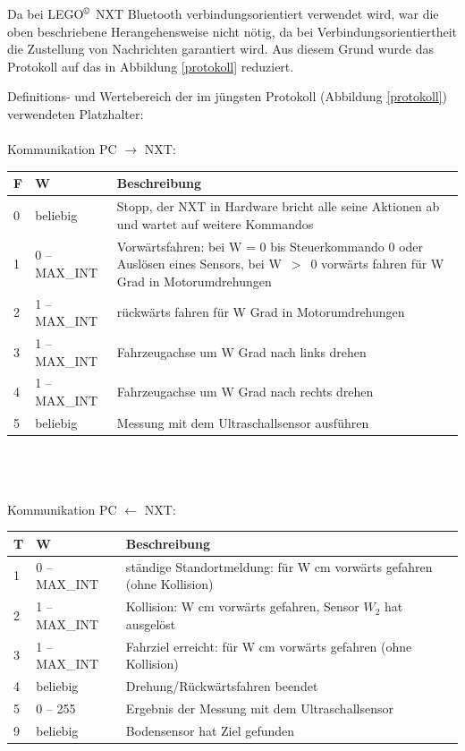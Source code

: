 \documentclass[10pt,a4paper]{scrartcl}
\begin{document}
Da bei LEGO$^\copyright$ NXT Bluetooth verbindungsorientiert verwendet wird, war die oben beschriebene Herangehensweise nicht nötig, da bei Verbindungsorientiertheit die Zustellung von Nachrichten garantiert wird. Aus diesem Grund wurde das Protokoll auf das in Abbildung \ref{protokoll} reduziert.

Definitions- und Wertebereich der im jüngsten Protokoll (Abbildung \ref{protokoll}) verwendeten Platzhalter:\\
\\
Kommunikation PC $\rightarrow$ NXT:\\
\begin{tabular}{|l|l|p{133mm}|}
\hline \textbf{F} & \textbf{W} & \textbf{Beschreibung} \\ 
\hline 0 & beliebig & Stopp, der NXT in Hardware bricht alle seine Aktionen ab und wartet auf weitere Kommandos\\ 
\hline 1 & 0 -- MAX\_INT & Vorwärtsfahren: bei W = 0 bis Steuerkommando 0 oder Auslösen eines Sensors, bei W~$>$~0 vorwärts fahren für W Grad in Motorumdrehungen\\ 
\hline 2 & 1 -- MAX\_INT & rückwärts fahren für W Grad in Motorumdrehungen  \\ 
\hline 3 & 1 -- MAX\_INT & Fahrzeugachse um W Grad nach links drehen \\ 
\hline 4 & 1 -- MAX\_INT & Fahrzeugachse um W Grad nach rechts drehen \\ 
\hline 5 & beliebig & Messung mit dem Ultraschallsensor ausführen \\ 
\hline 
\end{tabular} \\
\\
\\
Kommunikation PC $\leftarrow$ NXT:\\
\begin{tabular}{|l|l|p{133mm}|}
\hline \textbf{T} & \textbf{W} & \textbf{Beschreibung} \\ 
\hline 1 & 0 -- MAX\_INT & ständige Standortmeldung: für W cm vorwärts gefahren (ohne Kollision)\\
\hline 2 & 1 -- MAX\_INT & Kollision: W cm vorwärts gefahren, Sensor $W_2$ hat ausgelöst\\ 
\hline 3 & 1 -- MAX\_INT & Fahrziel erreicht: für W cm vorwärts gefahren (ohne Kollision) \\ 
\hline 4 & beliebig & Drehung/Rückwärtsfahren beendet \\ 
\hline 5 & 0 -- 255  & Ergebnis der Messung mit dem Ultraschallsensor \\ 
\hline 9 & beliebig & Bodensensor hat Ziel gefunden \\ 
\hline 
\end{tabular} \\
\end{document}
